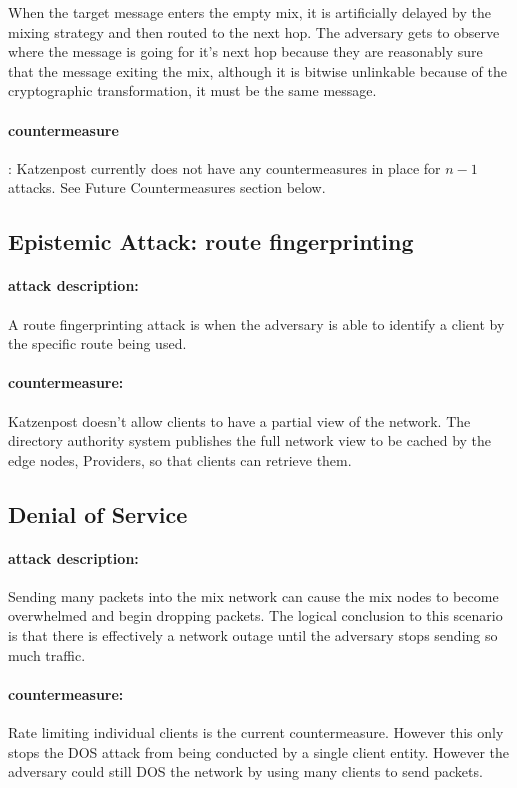 \documentclass{article}
\begin{document}
When the target message enters the empty mix, it is artificially delayed by the mixing strategy and then routed to the next hop.
The adversary gets to observe where the message is going for it's next hop because they are reasonably sure that the message
exiting the mix, although it is bitwise unlinkable because of the cryptographic transformation, it must be the same message.

\paragraph{countermeasure}: Katzenpost currently does not have any countermeasures in place for $n-1$ attacks. See Future Countermeasures section below.

\subsection{Epistemic Attack: route fingerprinting}

\paragraph{attack description:} A route fingerprinting attack is when the adversary is able
to identify a client by the specific route being used.

\paragraph{countermeasure:} Katzenpost doesn't allow clients to have a partial view of the network. The directory authority system publishes the full network view to be cached by the edge nodes, Providers, so that clients can retrieve them.

\subsection{Denial of Service}

\paragraph{attack description:}Sending many packets into the mix network can cause the mix
nodes to become overwhelmed and begin dropping packets. The logical conclusion to this scenario
is that there is effectively a network outage until the adversary stops sending so much traffic.

\paragraph{countermeasure:} Rate limiting individual clients is the current countermeasure. However this only stops the DOS attack from being conducted by a single client entity. However the adversary could still DOS the network by using many clients to send packets.
\end{document}
